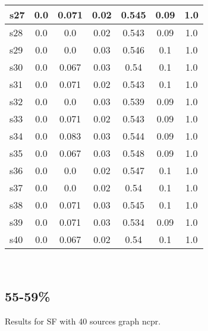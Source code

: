 \documentclass{article}
\begin{document}
\begin{tabular}{|l|c|c|c|c|c|c|}
\hline
s27 &0.0 & 0.071 & 0.02 & 0.545 & 0.09 & 1.0\\
\hline
s28 &0.0 & 0.0 & 0.02 & 0.543 & 0.09 & 1.0\\
\hline
s29 &0.0 & 0.0 & 0.03 & 0.546 & 0.1 & 1.0\\
\hline
s30 &0.0 & 0.067 & 0.03 & 0.54 & 0.1 & 1.0\\
\hline
s31 &0.0 & 0.071 & 0.02 & 0.543 & 0.1 & 1.0\\
\hline
s32 &0.0 & 0.0 & 0.03 & 0.539 & 0.09 & 1.0\\
\hline
s33 &0.0 & 0.071 & 0.02 & 0.543 & 0.09 & 1.0\\
\hline
s34 &0.0 & 0.083 & 0.03 & 0.544 & 0.09 & 1.0\\
\hline
s35 &0.0 & 0.067 & 0.03 & 0.548 & 0.09 & 1.0\\
\hline
s36 &0.0 & 0.0 & 0.02 & 0.547 & 0.1 & 1.0\\
\hline
s37 &0.0 & 0.0 & 0.02 & 0.54 & 0.1 & 1.0\\
\hline
s38 &0.0 & 0.071 & 0.03 & 0.545 & 0.1 & 1.0\\
\hline
s39 &0.0 & 0.071 & 0.03 & 0.534 & 0.09 & 1.0\\
\hline
s40 &0.0 & 0.067 & 0.02 & 0.54 & 0.1 & 1.0\\
\hline
\end{tabular}\\

\newpage

\subsection{55-59\%}

\noindent Results for SF with 40 sources graph ncpr.
\end{document}
